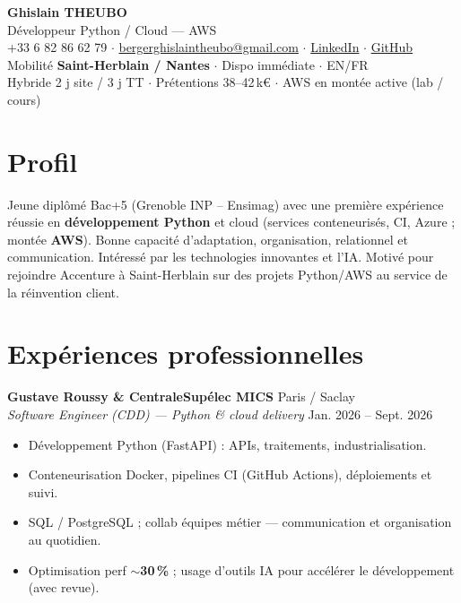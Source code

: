 \documentclass[10pt,a4paper]{article}
\begin{document}
\begin{center}
{\LARGE\bfseries Ghislain THEUBO}\\[2pt]
{\large D\'eveloppeur Python / Cloud --- AWS}\\[3pt]
+33 6 82 86 62 79 $\cdot$
\href{mailto:bergerghislaintheubo@gmail.com}{bergerghislaintheubo@gmail.com} $\cdot$
\href{https://www.linkedin.com/in/berger-ghislain}{LinkedIn} $\cdot$
\href{https://github.com/Bergerghislain}{GitHub}\\[1pt]
Mobilit\'e \textbf{Saint-Herblain / Nantes} $\cdot$ Dispo imm\'ediate $\cdot$ EN/FR\\[1pt]
\small Hybride 2 j site / 3 j TT $\cdot$ Pr\'etentions 38--42\,k€ $\cdot$ AWS en mont\'ee active (lab / cours)
\end{center}

\section{Profil}
Jeune dipl\^om\'e Bac+5 (Grenoble INP -- Ensimag) avec une premi\`ere exp\'erience r\'eussie en \textbf{d\'eveloppement Python} et cloud (services conteneuris\'es, CI, Azure ; mont\'ee \textbf{AWS}). Bonne capacit\'e d'adaptation, organisation, relationnel et communication. Int\'eress\'e par les technologies innovantes et l'IA. Motiv\'e pour rejoindre Accenture \`a Saint-Herblain sur des projets Python/AWS au service de la r\'einvention client.

\section{Exp\'eriences professionnelles}
\textbf{Gustave Roussy \& CentraleSup\'elec MICS} \hfill Paris / Saclay\\
\textit{Software Engineer (CDD) --- Python \& cloud delivery} \hfill Jan. 2026 -- Sept. 2026
\begin{itemize}
  \item D\'eveloppement Python (FastAPI) : APIs, traitements, industrialisation.
  \item Conteneurisation Docker, pipelines CI (GitHub Actions), d\'eploiements et suivi.
  \item SQL / PostgreSQL ; collab \'equipes m\'etier --- communication et organisation au quotidien.
  \item Optimisation perf $\sim$\textbf{30\,\%} ; usage d'outils IA pour acc\'el\'erer le d\'eveloppement (avec revue).
\end{itemize}
\end{document}
